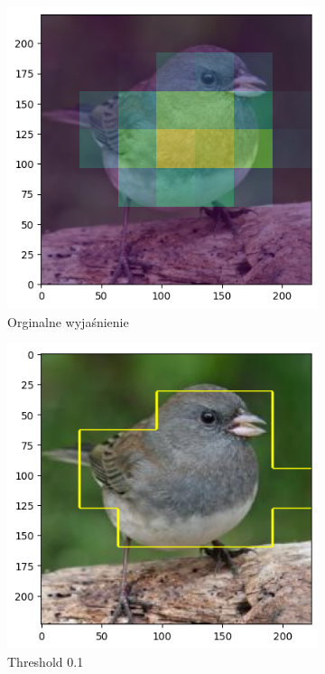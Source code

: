 \begin{figure}
	\centering
	\begin{subfigure}[b]{0.9\textwidth}
		\centering
		\includegraphics[width=.45\textwidth]{img/parameters/gradcam/threshold_base}
		\caption{Orginalne wyjaśnienie}  \label{rys:parameters_lime_numsamples_5}
	\end{subfigure}
	\begin{subfigure}[b]{0.45\textwidth}
		\centering\includegraphics[width=.9\textwidth]{img/parameters/gradcam/threshold_01}
		\caption{Threshold 0.1}  \label{rys:parameters_lime_numsamples_1000}
	\end{subfigure}
	\begin{subfigure}[b]{0.45\textwidth}

\end{subfigure}
\end{figure}
